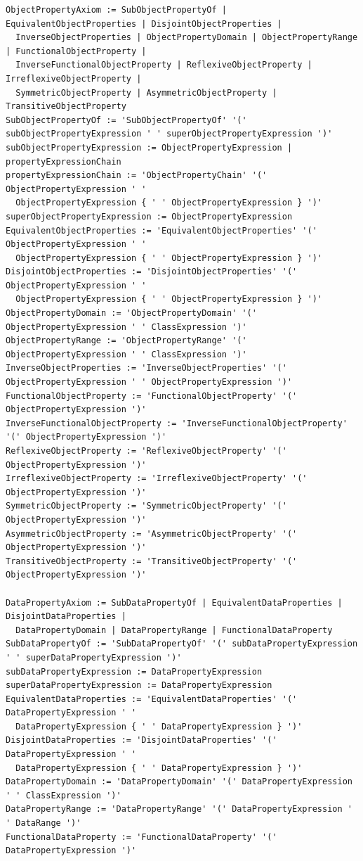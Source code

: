 \documentclass[a4paper]{article}
\newcounter{ex}
\begin{document}
\begin{enumerate}
{\begin{verbatim}
ObjectPropertyAxiom := SubObjectPropertyOf | EquivalentObjectProperties | DisjointObjectProperties |
  InverseObjectProperties | ObjectPropertyDomain | ObjectPropertyRange | FunctionalObjectProperty |
  InverseFunctionalObjectProperty | ReflexiveObjectProperty | IrreflexiveObjectProperty |
  SymmetricObjectProperty | AsymmetricObjectProperty | TransitiveObjectProperty
SubObjectPropertyOf := 'SubObjectPropertyOf' '(' subObjectPropertyExpression ' ' superObjectPropertyExpression ')'
subObjectPropertyExpression := ObjectPropertyExpression | propertyExpressionChain
propertyExpressionChain := 'ObjectPropertyChain' '(' ObjectPropertyExpression ' '
  ObjectPropertyExpression { ' ' ObjectPropertyExpression } ')'
superObjectPropertyExpression := ObjectPropertyExpression
EquivalentObjectProperties := 'EquivalentObjectProperties' '(' ObjectPropertyExpression ' '
  ObjectPropertyExpression { ' ' ObjectPropertyExpression } ')'
DisjointObjectProperties := 'DisjointObjectProperties' '(' ObjectPropertyExpression ' '
  ObjectPropertyExpression { ' ' ObjectPropertyExpression } ')'
ObjectPropertyDomain := 'ObjectPropertyDomain' '(' ObjectPropertyExpression ' ' ClassExpression ')'
ObjectPropertyRange := 'ObjectPropertyRange' '(' ObjectPropertyExpression ' ' ClassExpression ')'
InverseObjectProperties := 'InverseObjectProperties' '(' ObjectPropertyExpression ' ' ObjectPropertyExpression ')'
FunctionalObjectProperty := 'FunctionalObjectProperty' '(' ObjectPropertyExpression ')'
InverseFunctionalObjectProperty := 'InverseFunctionalObjectProperty' '(' ObjectPropertyExpression ')'
ReflexiveObjectProperty := 'ReflexiveObjectProperty' '(' ObjectPropertyExpression ')'
IrreflexiveObjectProperty := 'IrreflexiveObjectProperty' '(' ObjectPropertyExpression ')'
SymmetricObjectProperty := 'SymmetricObjectProperty' '(' ObjectPropertyExpression ')'
AsymmetricObjectProperty := 'AsymmetricObjectProperty' '(' ObjectPropertyExpression ')'
TransitiveObjectProperty := 'TransitiveObjectProperty' '(' ObjectPropertyExpression ')'

DataPropertyAxiom := SubDataPropertyOf | EquivalentDataProperties | DisjointDataProperties |
  DataPropertyDomain | DataPropertyRange | FunctionalDataProperty
SubDataPropertyOf := 'SubDataPropertyOf' '(' subDataPropertyExpression ' ' superDataPropertyExpression ')'
subDataPropertyExpression := DataPropertyExpression
superDataPropertyExpression := DataPropertyExpression
EquivalentDataProperties := 'EquivalentDataProperties' '(' DataPropertyExpression ' '
  DataPropertyExpression { ' ' DataPropertyExpression } ')'
DisjointDataProperties := 'DisjointDataProperties' '(' DataPropertyExpression ' '
  DataPropertyExpression { ' ' DataPropertyExpression } ')'
DataPropertyDomain := 'DataPropertyDomain' '(' DataPropertyExpression ' ' ClassExpression ')'
DataPropertyRange := 'DataPropertyRange' '(' DataPropertyExpression ' ' DataRange ')'
FunctionalDataProperty := 'FunctionalDataProperty' '(' DataPropertyExpression ')'


\end{verbatim}}
\end{enumerate}
\end{document}
